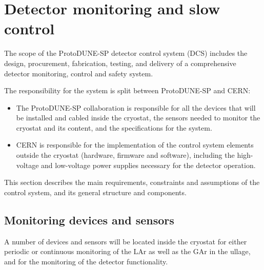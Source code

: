 \section{Detector monitoring and slow control}
\label{sec:slowcontrol}

The scope of the ProtoDUNE-SP detector control system (DCS) includes the design, procurement, fabrication, testing,
and delivery
of a comprehensive detector monitoring, control and safety system.

The responsibility for the system is split between ProtoDUNE-SP and CERN: 
\begin{itemize}
\item	The ProtoDUNE-SP collaboration is responsible for all the devices that will be installed and cabled inside 
the cryostat, the sensors needed to monitor the cryostat and its content, and the specifications for the system. %
\item	CERN is responsible for the implementation of the control system elements outside the cryostat (hardware, firmware and software), including the high-voltage and low-voltage power supplies necessary for the detector operation.
\end{itemize}

This section describes %
the main requirements, 
constraints and assumptions of the control system, and its general structure and components. 

\subsection{Monitoring devices and sensors}
A number of %
devices and sensors will be located inside the cryostat for either periodic or continuous monitoring of %
the LAr as well as the GAr in the ullage, %
and for the monitoring of the detector functionality.


